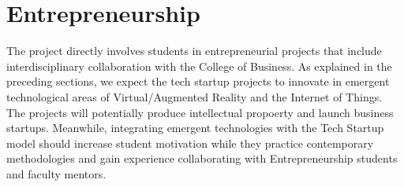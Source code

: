 \documentclass[letterpaper]{article}
\begin{document}
  \section{Entrepreneurship}
  The project directly involves students in entrepreneurial projects that include interdisciplinary collaboration with the College of Business. As explained in the preceding sections, we expect the tech startup projects to innovate in emergent technological areas of Virtual/Augmented Reality and the Internet of Things. The projects will potentially produce intellectual propoerty and launch business startups. Meanwhile, integrating emergent technologies with the Tech Startup model should increase student motivation while they practice contemporary methodologies and gain experience collaborating with Entrepreneurship students and faculty mentors.
\end{document}
